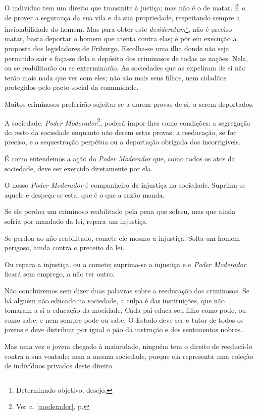 O indivíduo tem um direito que transmite à justiça; mas não é o de
matar. É o de prover a segurança da sua vila e da sua propriedade,
respeitando sempre a inviolabilidade do homem. Mas para obter este
\emph{desideratum}\footnote{Determinado objetivo, desejo.}, não é
preciso matar, basta deportar o homem que atenta contra elas; é pôr em
execução a proposta dos legisladores de Friburgo. Escolha-se uma ilha
donde não seja permitido sair e faça-se dela o depósito dos criminosos
de todas as nações. Nela, ou se reabilitarão ou se exterminarão. As
sociedades que as expeliram de si não terão mais nada que ver com eles;
não são mais seus filhos, nem cidadãos protegidos pelo pacto social da
comunidade.

Muitos criminosos preferirão sujeitar-se a darem provas de si, a serem
deportados.

A sociedade, \emph{Poder Moderador}\footnote{Ver n. \ref{moderador}, p. 
\pageref{moderador}}, poderá impor-lhes como condições: a segregação 
do resto da sociedade enquanto não derem estas provas; a reeducação, 
se for preciso, e a sequestração perpétua ou a deportação obrigada dos incorrigíveis.

É como entendemos a ação do \emph{Poder Moderador} que, como todos os
atos da sociedade, deve ser exercido diretamente por ela.

O nosso \emph{Poder Moderador} é companheiro da injustiça na sociedade.
Suprima-se aquele e despeça-se esta, que é o que a razão manda.

Se ele perdoa um criminoso reabilitado pela pena que sofreu, mas que
ainda sofria por mandado da lei, repara um injustiça.

Se perdoa ao não reabilitado, comete ele mesmo a injustiça. Solta um
homem perigoso, ainda contra o preceito da lei.

Ou repara a injustiça, ou a comete; suprima-se a injustiça e o
\emph{Poder Moderador} ficará sem emprego, a não ter outro.

Não concluiremos sem dizer duas palavras sobre a reeducação dos
criminosos. Se há alguém não educado na sociedade, a culpa é das
instituições, que não tomaram a si a educação da mocidade. Cada pai
educa seu filho como pode, ou como sabe; e nem sempre pode ou sabe. O
Estado deve ser o tutor de todos os jovens e deve distribuir por igual o
pão da instrução e dos sentimentos nobres.

Mas uma vez o jovem chegado à maioridade, ninguém tem o direito de
reeducá-lo contra a sua vontade; nem a mesma sociedade, porque ela
representa uma coleção de indivíduos privados deste direito.

